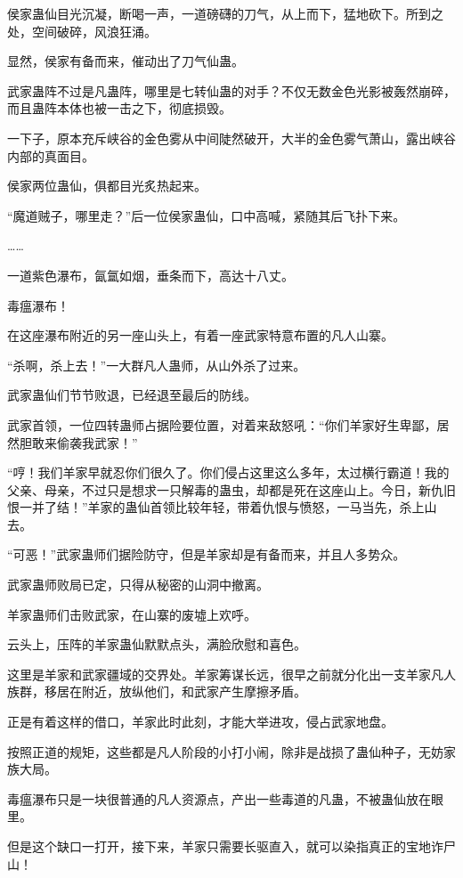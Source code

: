 \begin{this_body}
侯家蛊仙目光沉凝，断喝一声，一道磅礴的刀气，从上而下，猛地砍下。所到之处，空间破碎，风浪狂涌。

显然，侯家有备而来，催动出了刀气仙蛊。

武家蛊阵不过是凡蛊阵，哪里是七转仙蛊的对手？不仅无数金色光影被轰然崩碎，而且蛊阵本体也被一击之下，彻底损毁。

一下子，原本充斥峡谷的金色雾从中间陡然破开，大半的金色雾气萧山，露出峡谷内部的真面目。

侯家两位蛊仙，俱都目光炙热起来。

“魔道贼子，哪里走？”后一位侯家蛊仙，口中高喊，紧随其后飞扑下来。

……

一道紫色瀑布，氤氲如烟，垂条而下，高达十八丈。

毒瘟瀑布！

在这座瀑布附近的另一座山头上，有着一座武家特意布置的凡人山寨。

“杀啊，杀上去！”一大群凡人蛊师，从山外杀了过来。

武家蛊仙们节节败退，已经退至最后的防线。

武家首领，一位四转蛊师占据险要位置，对着来敌怒吼：“你们羊家好生卑鄙，居然胆敢来偷袭我武家！”

“哼！我们羊家早就忍你们很久了。你们侵占这里这么多年，太过横行霸道！我的父亲、母亲，不过只是想求一只解毒的蛊虫，却都是死在这座山上。今日，新仇旧恨一并了结！”羊家的蛊仙首领比较年轻，带着仇恨与愤怒，一马当先，杀上山去。

“可恶！”武家蛊师们据险防守，但是羊家却是有备而来，并且人多势众。

武家蛊师败局已定，只得从秘密的山洞中撤离。

羊家蛊师们击败武家，在山寨的废墟上欢呼。

云头上，压阵的羊家蛊仙默默点头，满脸欣慰和喜色。

这里是羊家和武家疆域的交界处。羊家筹谋长远，很早之前就分化出一支羊家凡人族群，移居在附近，放纵他们，和武家产生摩擦矛盾。

正是有着这样的借口，羊家此时此刻，才能大举进攻，侵占武家地盘。

按照正道的规矩，这些都是凡人阶段的小打小闹，除非是战损了蛊仙种子，无妨家族大局。

毒瘟瀑布只是一块很普通的凡人资源点，产出一些毒道的凡蛊，不被蛊仙放在眼里。

但是这个缺口一打开，接下来，羊家只需要长驱直入，就可以染指真正的宝地诈尸山！


\end{this_body}
